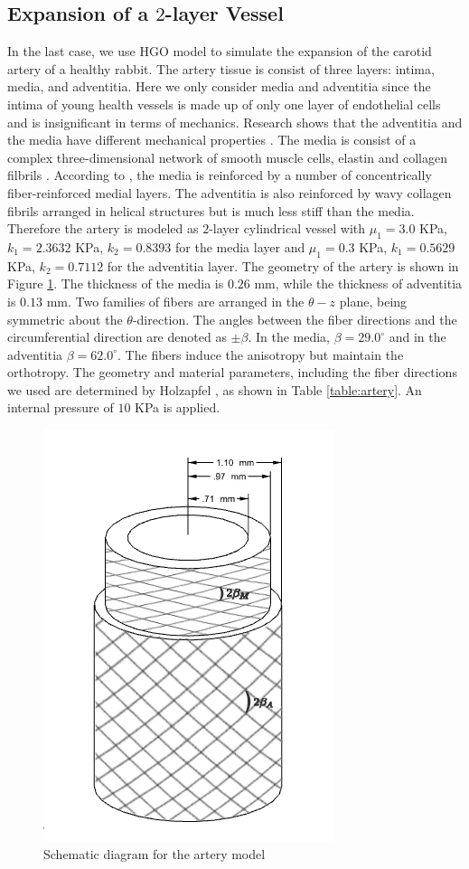 \subsection{Expansion of a $2$-layer Vessel}
In the last case, we use HGO model to simulate the expansion of the carotid artery of a healthy rabbit. The artery tissue is consist of three layers: intima, media, and adventitia. Here we only consider media and adventitia since the intima of young health vessels is made up of only one layer of endothelial cells and is insignificant in terms of mechanics. Research shows that the adventitia and the media have different mechanical properties \cite{Keitzer, Fung3}. The media is consist of a complex three-dimensional network of smooth muscle cells, elastin and collagen filbrils \cite{Holzapfel2}. According to \cite{Rhodin}, the media is reinforced by a number of concentrically fiber-reinforced medial layers. The adventitia is also reinforced by wavy collagen fibrils arranged in helical structures but is much less stiff than the media. Therefore the artery is modeled as $2$-layer cylindrical vessel with $\mu_1 = 3.0$ KPa, $k_1 = 2.3632$ KPa, $k_2 = 0.8393$ for the media layer and $\mu_1 = 0.3$ KPa, $k_1 = 0.5629$ KPa, $k_2 = 0.7112$ for the adventitia layer. The geometry of the artery is shown in Figure \ref{fig:vessel_schematic3}. The thickness of the media is $0.26$ mm, while the thickness of adventitia is $0.13$ mm. Two families of fibers are arranged in the $\theta-z$ plane, being symmetric about the $\theta$-direction. The angles between the fiber directions and the circumferential direction are denoted as $\pm\beta$. In the media, $\beta = 29.0^\circ$ and in the adventitia $\beta = 62.0^\circ$. The fibers induce the anisotropy but maintain the orthotropy. The geometry and material parameters, including the fiber directions we used are determined by Holzapfel \cite{Holzapfel2}, as shown in Table \ref{table:artery}. An internal pressure of $10$ KPa is applied. 

\begin{figure}[H]
\centering
\includegraphics[width=.3\textwidth]{./figures/vessel_schematic2.png}
\caption{Schematic diagram for the artery model}
\label{fig:vessel_schematic3}
\end{figure}

